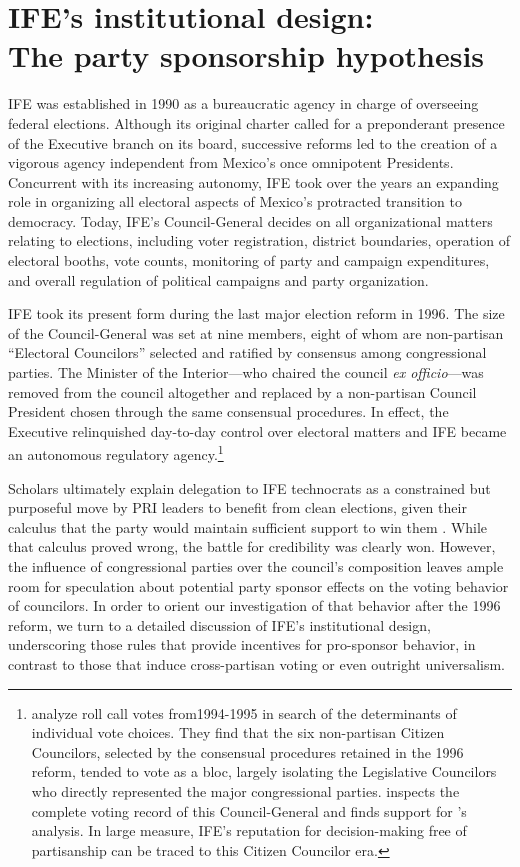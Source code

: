 \documentclass[12 pt, letter]{article}
\begin{document}
\singlespacing
\section{IFE's institutional design:\\  The party sponsorship hypothesis}\label{S:description}
\doublespacing
IFE was established in 1990 as a bureaucratic agency
in charge of overseeing federal elections.  Although its original
charter called for a preponderant presence of the Executive branch
on its board, successive reforms led to the creation of a vigorous
agency independent from Mexico's once omnipotent Presidents.
Concurrent with its increasing autonomy, IFE took over the years an
expanding role in organizing all electoral aspects of Mexico's
protracted transition to democracy.  Today, IFE's Council-General
decides on all organizational matters relating to elections,
including voter registration, district boundaries, operation of
electoral booths, vote counts, monitoring of party and campaign
expenditures, and overall regulation of political campaigns and
party organization.

IFE took its present form during the last major election reform in
1996.  The size of the Council-General was set at nine members,
eight of whom are non-partisan ``Electoral Councilors'' selected and
ratified by consensus among congressional parties.  The Minister of
the Interior---who chaired the council \emph{ex officio}---was
removed from the council altogether and replaced by a non-partisan
Council President chosen through the same consensual procedures.  In
effect, the Executive relinquished day-to-day control over electoral
matters and IFE became an autonomous regulatory
agency.\footnote{\citet{Malo1996} analyze roll call votes
from1994-1995 in search of the determinants of individual vote
choices. They find that the six non-partisan Citizen Councilors,
selected by the consensual procedures retained in the 1996 reform,
tended to vote as a bloc, largely isolating the Legislative
Councilors who directly represented the major congressional parties.
\citet{Rosas2004} inspects the complete voting record of this
Council-General and finds support for \citeauthor{Malo1996}'s
analysis.  In large measure, IFE's reputation for decision-making
free of partisanship can be traced to this Citizen Councilor era.}

Scholars ultimately explain delegation to IFE technocrats as a
constrained but purposeful move by PRI leaders to benefit from clean
elections, given their calculus that the party would maintain
sufficient support to win them \citep{Magaloni2006}.  While that
calculus proved wrong, the battle for credibility was clearly won.
However, the influence of congressional parties over the council's
composition leaves ample room for speculation about potential party
sponsor effects on the voting behavior of councilors.  In order to
orient our investigation of that behavior after the 1996 reform, we
turn to a detailed discussion of IFE's institutional design,
underscoring those rules that provide incentives for pro-sponsor
behavior, in contrast to those that induce cross-partisan voting or
even outright universalism.
\end{document}
